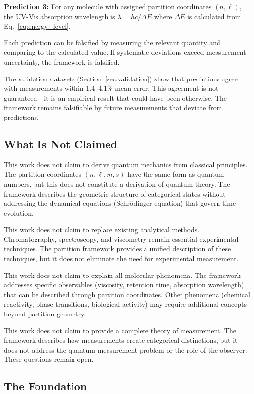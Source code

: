 \documentclass[twocolumn,superscriptaddress,prb,10pt]{revtex4-2}
\begin{document}
\textbf{Prediction 3:} For any molecule with assigned partition coordinates $(n, \ell)$, the UV-Vis absorption wavelength is $\lambda = hc/\Delta E$ where $\Delta E$ is calculated from Eq.~\ref{eq:energy_level}.

Each prediction can be falsified by measuring the relevant quantity and comparing to the calculated value. If systematic deviations exceed measurement uncertainty, the framework is falsified.

The validation datasets (Section~\ref{sec:validation}) show that predictions agree with measurements within 1.4–4.1\% mean error. This agreement is not guaranteed—it is an empirical result that could have been otherwise. The framework remains falsifiable by future measurements that deviate from predictions.

\subsection{What Is Not Claimed}

This work does not claim to derive quantum mechanics from classical principles. The partition coordinates $(n, \ell, m, s)$ have the same form as quantum numbers, but this does not constitute a derivation of quantum theory. The framework describes the geometric structure of categorical states without addressing the dynamical equations (Schrödinger equation) that govern time evolution.

This work does not claim to replace existing analytical methods. Chromatography, spectroscopy, and viscometry remain essential experimental techniques. The partition framework provides a unified description of these techniques, but it does not eliminate the need for experimental measurement.

This work does not claim to explain all molecular phenomena. The framework addresses specific observables (viscosity, retention time, absorption wavelength) that can be described through partition coordinates. Other phenomena (chemical reactivity, phase transitions, biological activity) may require additional concepts beyond partition geometry.

This work does not claim to provide a complete theory of measurement. The framework describes how measurements create categorical distinctions, but it does not address the quantum measurement problem or the role of the observer. These questions remain open.

\subsection{The Foundation}
\end{document}
